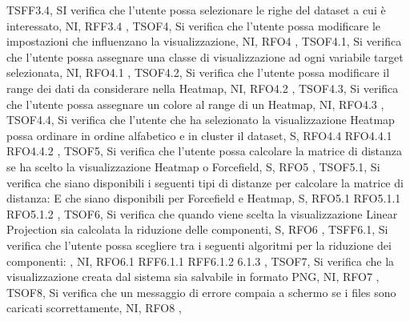 {    {   
        TSFF3.4,
        SI verifica che l'utente possa selezionare le righe del dataset a cui è interessato,
        NI,
        RFF3.4
    },
    {   
        TSOF4,
        Si verifica che l'utente possa modificare le impostazioni che influenzano la visualizzazione,
        NI,
        RFO4
    },
    {   
        TSOF4.1,
        Si verifica che l'utente possa assegnare una classe di visualizzazione ad ogni variabile target selezionata,
        NI,
        RFO4.1
    },
    {   
        TSOF4.2,
        Si verifica che l'utente possa modificare il range dei dati da considerare nella Heatmap,
        NI,
        RFO4.2
    },
    {   
        TSOF4.3,
        Si verifica che l'utente possa assegnare un colore al range di un Heatmap,
        NI,
        RFO4.3
    },
    {   
        TSOF4.4,
        Si verifica che l'utente che ha selezionato la visualizzazione Heatmap possa ordinare in ordine alfabetico e in cluster il dataset,
        S,
        RFO4.4 RFO4.4.1 RFO4.4.2
    },
    {   
        TSOF5,
        Si verifica che l'utente possa calcolare la matrice di distanza se ha scelto la visualizzazione Heatmap o Forcefield,
        S,
        RFO5
    },    
    {   
        TSOF5.1,
        Si verifica che siano disponibili i seguenti tipi di distanze per calcolare la matrice di distanza:
        E che siano disponibili per Forcefield e Heatmap,
        S,
        RFO5.1 RFO5.1.1 RFO5.1.2
    },
    {   
        TSOF6,
        Si verifica che quando viene scelta la visualizzazione Linear Projection sia calcolata la riduzione delle componenti,
        S,
        RFO6
    },
    {   
        TSFF6.1,
        Si verifica che l'utente possa scegliere tra i seguenti algoritmi per la riduzione dei componenti:
        ,
        NI,
        RFO6.1 RFF6.1.1 RFF6.1.2 6.1.3
    },
    {   
        TSOF7,
        Si verifica che la visualizzazione creata dal sistema sia salvabile in formato PNG,
        NI,
        RFO7
    },
    {   
        TSOF8,
        Si verifica che un messaggio di errore compaia a schermo se i files sono caricati scorrettamente,
        NI,
        RFO8
    },
    }
    
    
